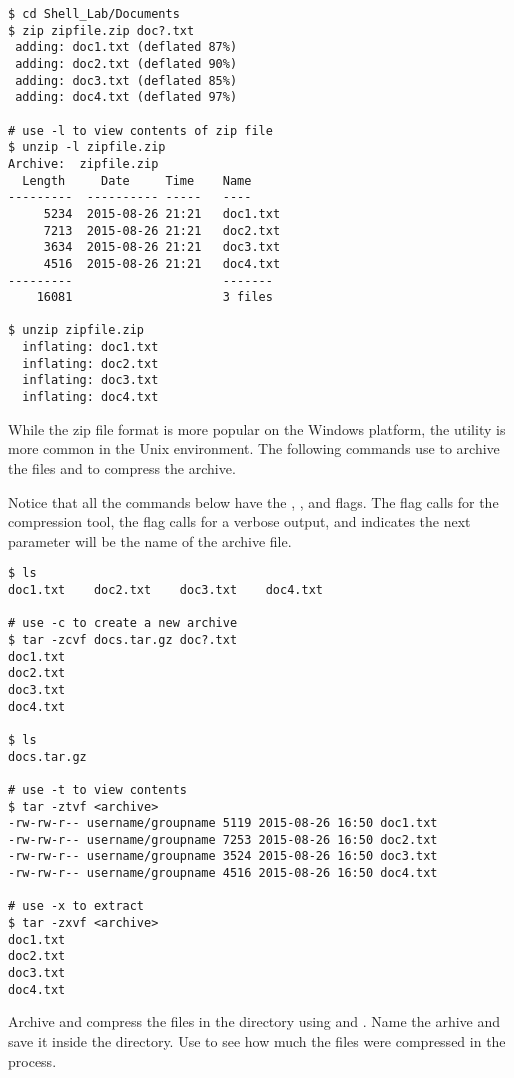 \begin{lstlisting}
$ cd Shell_Lab/Documents
$ zip zipfile.zip doc?.txt
 adding: doc1.txt (deflated 87%)
 adding: doc2.txt (deflated 90%)
 adding: doc3.txt (deflated 85%)
 adding: doc4.txt (deflated 97%)

# use -l to view contents of zip file
$ unzip -l zipfile.zip
Archive:  zipfile.zip
  Length     Date     Time    Name
---------  ---------- -----   ----
     5234  2015-08-26 21:21   doc1.txt
     7213  2015-08-26 21:21   doc2.txt
     3634  2015-08-26 21:21   doc3.txt
     4516  2015-08-26 21:21   doc4.txt
---------                     -------
    16081                     3 files
    
$ unzip zipfile.zip
  inflating: doc1.txt                
  inflating: doc2.txt                
  inflating: doc3.txt
  inflating: doc4.txt
\end{lstlisting}

While the zip file format is more popular on the Windows platform, the  utility is more common in the Unix environment. The following commands use  to archive the files and  to compress the archive. 

Notice that all the commands below have the , , and  flags. The  flag calls for the  compression tool, the  flag calls for a verbose output, and  indicates the next parameter will be the name of the archive file. 

\begin{lstlisting}
$ ls
doc1.txt	doc2.txt	doc3.txt	doc4.txt

# use -c to create a new archive
$ tar -zcvf docs.tar.gz doc?.txt 
doc1.txt
doc2.txt
doc3.txt
doc4.txt

$ ls
docs.tar.gz

# use -t to view contents
$ tar -ztvf <archive>                    
-rw-rw-r-- username/groupname 5119 2015-08-26 16:50 doc1.txt
-rw-rw-r-- username/groupname 7253 2015-08-26 16:50 doc2.txt
-rw-rw-r-- username/groupname 3524 2015-08-26 16:50 doc3.txt
-rw-rw-r-- username/groupname 4516 2015-08-26 16:50 doc4.txt

# use -x to extract
$ tar -zxvf <archive>                   
doc1.txt
doc2.txt
doc3.txt
doc4.txt
\end{lstlisting}

\begin{problem}
Archive and compress the files in the  directory using  and . Name the arhive  and save it inside the  directory. Use  to see how much the files were compressed in the process.
\end{problem}

